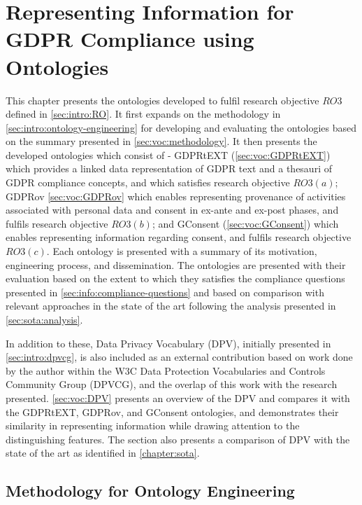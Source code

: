 \chapter{Representing Information for GDPR Compliance using Ontologies}
\label{chapter:vocabularies}

This chapter presents the ontologies developed to fulfil research objective $RO3$ defined in \autoref{sec:intro:RO}.
It first expands on the methodology in \autoref{sec:intro:ontology-engineering} for developing and evaluating the ontologies based on the summary presented in \autoref{sec:voc:methodology}.
It then presents the developed ontologies which consist of - GDPRtEXT (\autoref{sec:voc:GDPRtEXT}) which provides a linked data representation of GDPR text and a thesauri of GDPR compliance concepts, and which satisfies research objective $RO3(a)$; GDPRov \autoref{sec:voc:GDPRov} which enables representing provenance of activities associated with personal data and consent in ex-ante and ex-post phases, and fulfils research objective $RO3(b)$; and GConsent (\autoref{sec:voc:GConsent}) which enables representing information regarding consent, and fulfils research objective $RO3(c)$.
Each ontology is presented with a summary of its motivation, engineering process, and dissemination. The ontologies are presented with their evaluation based on the extent to which they satisfies the compliance questions presented in \autoref{sec:info:compliance-questions} and based on comparison with relevant approaches in the state of the art following the analysis presented in \autoref{sec:sota:analysis}.

In addition to these, Data Privacy Vocabulary (DPV), initially presented in \autoref{sec:intro:dpvcg}, is also included as an external contribution based on work done by the author within the W3C Data Protection Vocabularies and Controls Community Group (DPVCG), and the overlap of this work with the research presented. \autoref{sec:voc:DPV} presents an overview of the DPV and compares it with the GDPRtEXT, GDPRov, and GConsent ontologies, and demonstrates their similarity in representing information while drawing attention to the distinguishing features.
The section also presents a comparison of DPV with the state of the art as identified in \autoref{chapter:sota}.

\section{Methodology for Ontology Engineering}\label{sec:voc:methodology}

